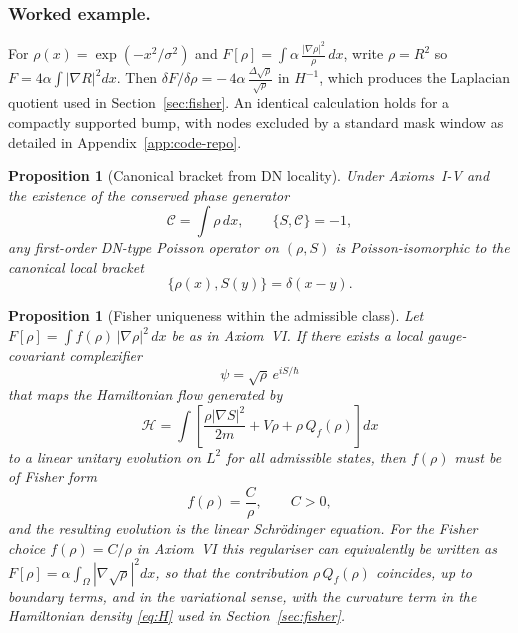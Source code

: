 \documentclass[11pt,a4paper]{article}
\numberwithin{equation}{section}
\theoremstyle{thmcompact}
\newtheorem{proposition}[theorem]{Proposition}
\theoremstyle{remark}
\begin{document}
	\subsubsection*{Worked example.}
	For $\rho(x)=\exp(-x^2/\sigma^2)$ and $F[\rho]=\int \alpha\,\frac{|\nabla\rho|^2}{\rho}\,dx$,
	write $\rho=R^2$ so $F=4\alpha\int |\nabla R|^2 dx$.
	Then $\delta F/\delta \rho = -\,4\alpha\,\frac{\Delta \sqrt{\rho}}{\sqrt{\rho}}$ in $H^{-1}$,
	which produces the Laplacian quotient used in Section~\ref{sec:fisher}.
	An identical calculation holds for a compactly supported bump, with nodes excluded by a standard mask window as detailed in Appendix~\ref{app:code-repo}.
	
\begin{proposition}[Canonical bracket from DN locality]\label{prop:DN-canonical}
	Under Axioms~I-V and the existence of the conserved phase generator
	\[
	\mathcal C = \int \rho\,dx,
	\qquad
	\{S,\mathcal C\} = -1,
	\]
	any first-order DN-type Poisson operator on $(\rho,S)$ is Poisson-isomorphic
	to the canonical local bracket
	\[
	\{\rho(x),S(y)\} = \delta(x-y).
	\]
\end{proposition}

\begin{proposition}[Fisher uniqueness within the admissible class]\label{prop:fisher-uniqueness}
	Let $F[\rho]=\int f(\rho)\,|\nabla\rho|^{2}\,dx$ be as in Axiom~VI. If there
	exists a local gauge-covariant complexifier
	\[
	\psi=\sqrt{\rho}\,e^{iS/\hbar}
	\]
	that maps the Hamiltonian flow generated by
	\[
	\mathcal H=\int\left[
	\frac{\rho|\nabla S|^{2}}{2m}+V\rho+\rho\,Q_{f}(\rho)
	\right]dx
	\]
	to a linear unitary evolution on $L^{2}$ for all admissible states, then
	$f(\rho)$ must be of Fisher form
	\[
	f(\rho) = \frac{C}{\rho}, \qquad C>0,
	\]
	and the resulting evolution is the linear Schrödinger equation. 
For the Fisher choice $f(\rho)=C/\rho$ in Axiom~VI this regulariser can equivalently be written as
\(
F[\rho]=\alpha\int_{\Omega}|\nabla\sqrt{\rho}|^{2}dx
\),
so that the contribution $\rho\,Q_{f}(\rho)$ coincides, up to boundary terms, and in the variational sense, with the curvature term in the Hamiltonian density \eqref{eq:H} used in Section~\ref{sec:fisher}.

\end{proposition}
		
\end{document}
